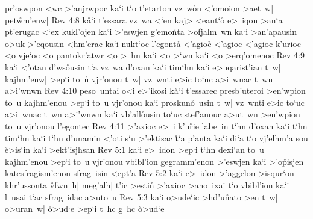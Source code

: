 pr'oswpon
<wc
>'anjrwpoc
ka`i
t`o
t'etarton
vz~w\r{o}n
<'omoion
>aet~w|
pet\r{w}m'enw|\bibvsend
{}
\vs Rev 4:8
k\r{a}`i
t'essara
vz~wa
<`en
kaj>
<eaut`o\r{}
e>~iqon
>an`a
pt'erugac
<`ex
kukl'ojen
ka`i
>'eswjen
g'emo\r{n}ta
>ofjalm~wn
ka`i
>an'apausin
o>uk
>'eqousin
<hm'erac
ka`i
nukt`oc
l'egont\r{a}
<'agioc\r{}
<'agioc
<'agioc
k'urioc
<o
vje`oc
<o
pantokr'atwr
<o
>~hn
ka`i
<o
>`wn
ka`i
<o
>erq'omenoc\bibvsend
\vs Rev 4:9
ka`i
<'otan
d'ws\r{o}usin
t`a
vz~wa
d'oxan
ka`i
tim`hn
ka`i
e>uqarist'ian
t~w|
kajhm'enw|
>ep`i
to~u\r{}
vjr'onou
t~w|
vz~wnti
e>ic
to`uc
a>i~wnac
t~wn
a>i'wnwn\bibvsend
\vs Rev 4:10
peso~untai
o<i
e>'ikosi
k\r{a}`i
t'essarec
presb'uteroi
>en'wpion
to~u
kajhm'enou
>ep`i
to~u
vjr'onou
ka`i
proskun\r{o}~usin
t~w|
vz~wnti
e>ic
to`uc
a>i~wnac
t~wn
a>i'wnwn
ka`i
vb'all\r{o}usin
to`uc
stef'anouc
a>ut~wn
>en'wpion
to~u
vjr'onou
l'egontec\bibvsend
\vs Rev 4:11
>'axioc
e>~i
k'u\r{r}ie
labe~in
t`hn
d'oxan
ka`i
t`hn
tim`hn
ka`i
t`hn
d'unamin
<'oti
s`u
>'ektisac
\r{t}`a
p'anta
ka`i
di`a
t`o
vj'elhm'a
sou
\r{e}>is`in
ka`i
>ekt'isjhsan\bibvsend
\vs Rev 5:1
ka`i
e>~idon
>ep`i
t`hn
dexi`an
to~u
kajhm'enou
>ep`i
to~u
vjr'onou
vbibl'ion
gegramm'enon
>'eswjen
ka`i
>'o\r{p}isjen
katesfragism'enon
sfrag~isin
<ept'a\bibvsend
\vs Rev 5:2
ka`i
e>~idon
>'aggelon
>isqur`on
khr'ussonta
\r{vf}w\-n~h|
meg'alh|
t'ic
>estin\r{}
>'axioc
>ano~ixai
t`o
vbibl'ion
ka`i
l~usai
t`ac
sfrag~idac
a>uto~u\bibvsend
\vs Rev 5:3
ka`i
o>ude`ic
>hd'u\r{n}ato
>en
t~w|
o>uran~w|
\r{o}>ud`e
>ep`i
t~hc
g~hc
\r{o}>ud`e
